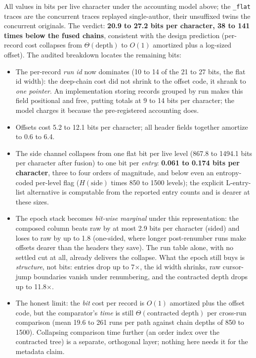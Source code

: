 \documentclass[11pt]{article}
\newcommand{\code}[1]{\texttt{#1}}
\begin{document}
\noindent All values in bits per live character under the accounting
model above; the \code{\_flat} traces are the concurrent traces
replayed single-author, their unsuffixed twins the concurrent
originals. The verdict: \textbf{20.9 to 27.2 bits per character, 38 to
141 times below the fused chains}, consistent with the design prediction
(per-record cost collapses from $\Theta(\mathrm{depth})$ to $O(1)$
amortized plus a log-sized offset). The audited breakdown locates the
remaining bits:
\begin{itemize}[leftmargin=2em]
\item The per-record \emph{run id} now dominates (10 to 14 of the 21 to
  27 bits, the flat id width): the deep-chain cost did not shrink to
  the offset code, it shrank to \emph{one pointer}. An implementation
  storing records grouped by run makes this field positional and free,
  putting totals at 9 to 14 bits per character; the model charges it
  because the pre-registered accounting does.
\item Offsets cost 5.2 to 12.1 bits per character; all header fields
  together amortize to 0.6 to 6.4.
\item The side channel collapses from one flat bit per live level
  (867.8 to 1494.1 bits per character after fusion) to one bit per
  \emph{entry}: \textbf{0.061 to 0.174 bits per character}, three to
  four orders of magnitude, and below even an entropy-coded per-level
  flag ($H(\mathrm{side})$ times 850 to 1500 levels); the explicit
  L-entry-list alternative is computable from the reported entry counts
  and is dearer at these sizes.
\item The epoch stack becomes \emph{bit-wise marginal} under this
  representation: the composed column beats raw by at most 2.9 bits per
  character (sided) and loses to raw by up to 1.8 (one-sided, where
  longer post-renumber runs make offsets dearer than the headers they
  save). The run table alone, with no settled cut at all, already
  delivers the collapse. What the epoch still buys is \emph{structure},
  not bits: entries drop up to 7$\times$, the id width shrinks, raw
  cursor-jump boundaries vanish under renumbering, and the contracted
  depth drops up to 11.8$\times$.
\item The honest limit: the \emph{bit} cost per record is $O(1)$
  amortized plus the offset code, but the comparator's \emph{time} is
  still $\Theta(\text{contracted depth})$ per cross-run comparison
  (mean 19.6 to 261 runs per path against chain depths of 850 to
  1500). Collapsing comparison time further (an order index over the
  contracted tree) is a separate, orthogonal layer; nothing here needs
  it for the metadata claim.
\end{itemize}
\end{document}
